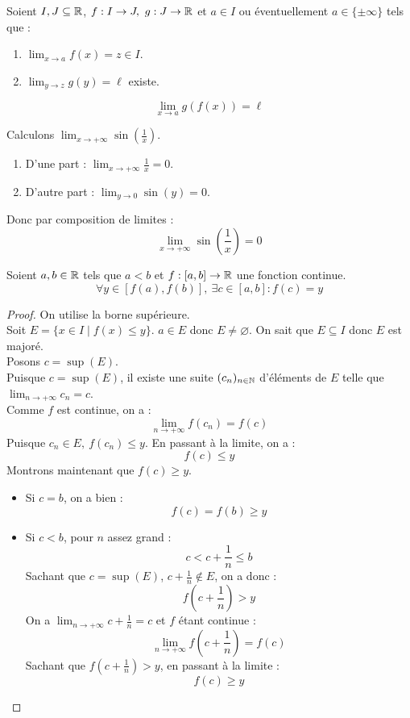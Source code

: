 \begin{theorem}
	Soient $I, J \subseteq \mathbb{R}$, $f : I \to J,\ g : J \to \mathbb{R}$ et $a \in I$ ou éventuellement $a \in \{ \pm \infty \}$ tels que :
	\begin{enumerate}
		\item $\lim_{x \to a} f(x) = z \in I$.
		\item $\lim_{y \to z} g(y) = \ell$ existe.
	\end{enumerate}
	\[ \lim_{x \to a} g(f(x)) = \ell \]
\end{theorem}

\begin{example}
	Calculons $\lim_{x \to +\infty} \sin \left( \frac{1}{x} \right)$.
	\begin{enumerate}
		\item D'une part : $\lim_{x \to +\infty} \frac{1}{x} = 0$.
		\item D'autre part : $\lim_{y \to 0} \sin(y) = 0$.
	\end{enumerate}
	Donc par composition de limites : 
	\[ \lim_{x \to +\infty} \sin \left( \frac{1}{x} \right) = 0 \]
\end{example}

\begin{theorem}
	Soient $a, b \in \mathbb{R}$ tels que $a < b$ et $f : [a, b] \to \mathbb{R}$ une fonction continue.
	\[ \forall y \in [f(a), f(b)],\ \exists c \in [a, b] : f(c) = y \]
\end{theorem}

\begin{proof}
	On utilise la borne supérieure.
	\\
	Soit $E = \{ x \in I \mid f(x) \leq y \}$. $a \in E$ donc $E \neq \varnothing$. On sait que $E \subseteq I$ donc $E$ est majoré.
	\\
	Posons $c = \sup(E)$.
	\\
	Puisque $c = \sup(E)$, il existe une suite $(c_n)_{n \in \mathbb{N}}$ d'éléments de $E$ telle que $\lim_{n \to +\infty} c_n = c$. 
	\\
	Comme $f$ est continue, on a :
	\[ \lim_{n \to +\infty} f(c_n) = f(c) \] 
	Puisque $c_n \in E,\ f(c_n) \leq y$. En passant à la limite, on a :
	\[ f(c) \leq y \]
	Montrons maintenant que $f(c) \geq y$.
	\begin{itemize}
		\item Si $c = b$, on a bien :
		\[ f(c) = f(b)  \geq y \]
		\item Si $c < b$, pour $n$ assez grand :
		\[ c < c + \frac{1}{n} \leq b \]
		Sachant que $c = \sup(E)$, $c + \frac{1}{n} \notin E$, on a donc :
		\[ f \left( c + \frac{1}{n} \right) > y \]
		On a $\lim_{n \to +\infty} c + \frac{1}{n} = c$ et $f$ étant continue :
		\[ \lim_{n \to +\infty} f \left( c + \frac{1}{n} \right) = f(c) \]
		Sachant que $f \left( c + \frac{1}{n} \right) > y$, en passant à la limite :
		\[ f(c) \geq y \]
	\end{itemize}
\end{proof}

